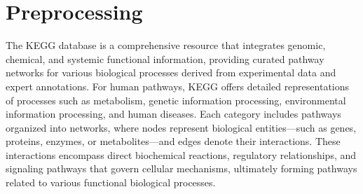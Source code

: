 \section{Preprocessing}
\label{app:dataprecessing}
The KEGG database is a comprehensive resource that integrates genomic, chemical, and systemic functional information, providing curated pathway networks for various biological processes derived from experimental data and expert annotations.
For human pathways, KEGG offers detailed representations of processes such as metabolism, genetic information processing, environmental information processing, and human diseases.
Each category includes pathways organized into networks, where nodes represent biological entities—such as genes, proteins, enzymes, or metabolites—and edges denote their interactions.
These interactions encompass direct biochemical reactions, regulatory relationships, and signaling pathways that govern cellular mechanisms, ultimately forming pathways related to various functional biological processes.   

